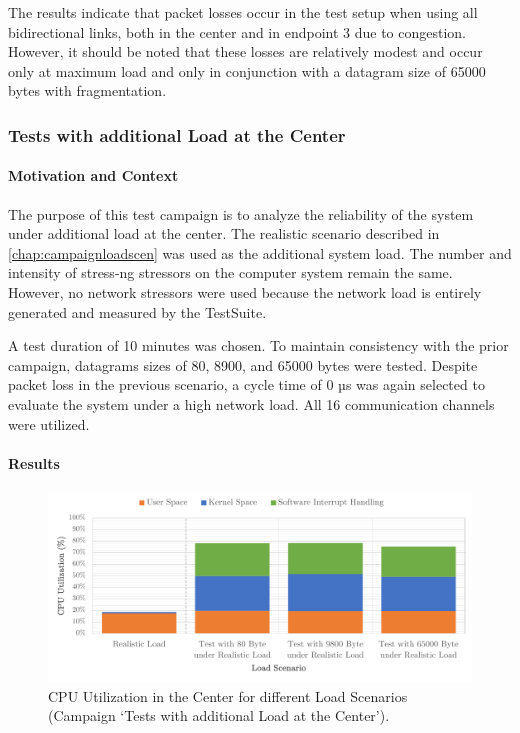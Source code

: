 The results indicate that packet losses occur in the test setup when using all bidirectional links, both in the center and in endpoint 3 due to congestion. However, it should be noted that these losses are relatively modest and occur only at maximum load and only in conjunction with a datagram size of 65000 bytes with fragmentation.

\subsubsection{Tests with additional Load at the Center}

\paragraph{Motivation and Context}
The purpose of this test campaign is to analyze the reliability of the system under additional load at the center. The realistic scenario described in \ref{chap:campaignloadscen} was used as the additional system load. The number and intensity of stress-ng stressors on the computer system remain the same. However, no network stressors were used because the network load is entirely generated and measured by the TestSuite.

A test duration of 10 minutes was chosen. To maintain consistency with the prior campaign, datagrams sizes of 80, 8900, and 65000 bytes were tested. Despite packet loss in the previous scenario, a cycle time of 0 µs was again selected to evaluate the system under a high network load. All 16 communication channels were utilized.

\paragraph{Results}

\begin{figure}[h]
    \centering
    \includegraphics[width=1\linewidth]{figures/reliability/ihawk/diagr7.pdf}
    \caption{CPU Utilization in the Center for different Load Scenarios (Campaign `Tests with additional Load at the Center').}
    \label{fig:diagr7CPU}
\end{figure}

